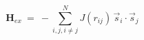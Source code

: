 \documentclass[preview]{standalone}
\begin{document}
\begin{varwidth}{50in}
  \begin{equation}
    \bm{H}_{ex} ~=~ -\sum_{i,j,i\neq j}^{N} {J} \left(r_{ij} \right)\, \vec{s}_{i}\cdot \vec{s}_{j} \nonumber
  \end{equation}
\end{varwidth}
\end{document}
